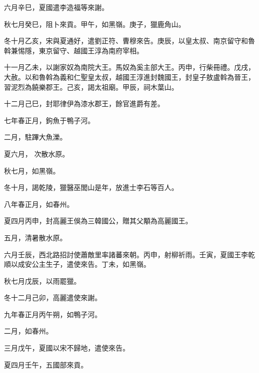 \begin{pinyinscope}
 六月辛巳，夏國遣李造福等來謝。



 秋七月癸巳，阻卜來貢。甲午，如黑嶺。庚子，獵鹿角山。



 冬十月乙亥，宋與夏通好，遣劉正符、曹穆來告。庚辰，以皇太叔、南京留守和魯斡兼惕隱，東京留守、越國王淳為南府宰相。



 十一月乙未，以謝家奴為南院大王。馬奴為奚主部大王。丙申，行柴冊禮。戊戌，大赦。以和魯斡為義和仁聖皇太叔，越國王淳進封魏國王，封皇子敖盧斡為晉王，習泥烈為饒樂郡王。己亥，謁太祖廟。甲辰，祠木葉山。



 十二月己巳，封耶律伊為漆水郡王，餘官進爵有差。



 七年春正月，鉤魚于鴨子河。



 二月，駐蹕大魚濼。



 夏六月，
 次散水原。



 秋七月，如黑嶺。



 冬十月，謁乾陵，獵醫巫閭山是年，放進士李石等百人。



 八年春正月，如春州。



 夏四月丙申，封高麗王俁為三韓國公，贈其父顒為高麗國王。



 五月，清暑散水原。



 六月壬辰，西北路招討使蕭敵里率諸蕃來朝。丙申，射柳祈雨。壬寅，夏國王李乾順以成安公主生子，遣使來告。丁未，如黑嶺。



 秋七月戊辰，以雨罷獵。



 冬十二月己卯，高麗遣使來謝。



 九年春正月丙午朔，如鴨子河。



 二月，如春州。



 三月戊午，夏國以宋不歸地，遣使來告。



 夏四月壬午，五國部來貢。




\end{pinyinscope}
